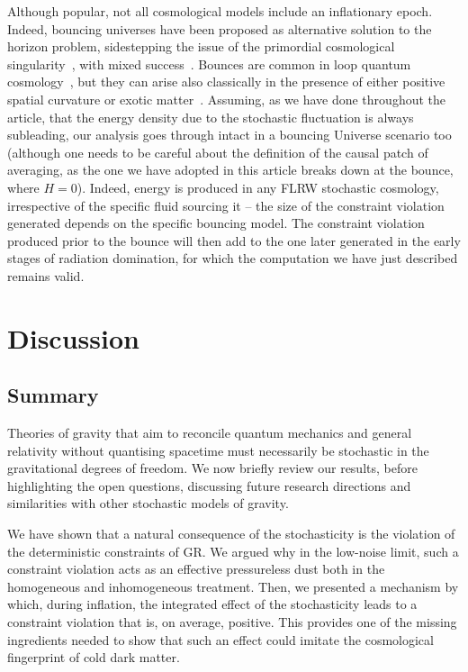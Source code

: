\documentclass[amsmath,amssymb,11pt]{article}
\begin{document}
Although popular, not all cosmological models include an inflationary epoch. Indeed, bouncing universes have been proposed as alternative solution to the horizon problem, sidestepping the issue of the primordial cosmological singularity~\cite{friedmann1922curvature,tolman1931periodic}, with mixed success~\cite{battefeld2014critical,brandenberger2016bouncing}. Bounces are common in loop quantum cosmology~\cite{ashtekar2006quantum}, but they can arise also classically in the presence of either positive spatial curvature or exotic matter~\cite{battefeld2014critical}. Assuming, as we have done throughout the article, that the energy density due to the stochastic fluctuation is always subleading, our analysis goes through intact in a bouncing Universe scenario too (although one needs to be careful about the definition of the causal patch of averaging, as the one we have adopted in this article breaks down at the bounce, where $H=0$). Indeed, energy is produced in any FLRW stochastic cosmology, irrespective of the specific fluid sourcing it -- the size of the constraint violation generated depends on the specific bouncing model. The constraint violation produced prior to the bounce will then add to the one later generated in the early stages of radiation domination, for which the computation we have just described remains valid. 

\section{Discussion} \label{sec:discussion}
\subsection{Summary}
Theories of gravity that aim to reconcile quantum mechanics and general relativity without quantising spacetime must necessarily be stochastic in the gravitational degrees of freedom. We now briefly review our results, before highlighting the open questions, discussing future research directions and similarities with other stochastic models of gravity.

We have shown that a natural consequence of the stochasticity is the violation of the deterministic constraints of GR. We argued why in the low-noise limit, such a constraint violation acts as an effective  pressureless dust both in the homogeneous and inhomogeneous treatment. Then, we presented a mechanism by which, during inflation, the integrated effect of the stochasticity leads to a constraint violation that is, on average, positive. This provides one of the missing ingredients needed to show that such an effect could imitate the cosmological fingerprint of cold dark matter. 
\end{document}
